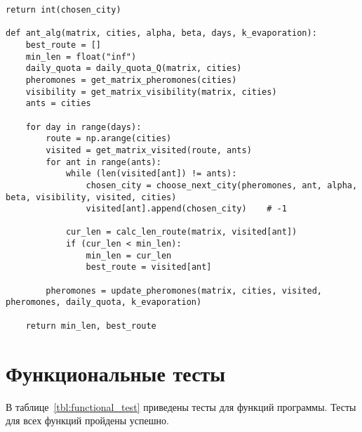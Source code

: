 \begin{center}
\begin{lstlisting}[label=lst:ant,caption=Муравьиный алгоритм]
	return int(chosen_city)

def ant_alg(matrix, cities, alpha, beta, days, k_evaporation):
	best_route = []
	min_len = float("inf")
	daily_quota = daily_quota_Q(matrix, cities)
	pheromones = get_matrix_pheromones(cities)
	visibility = get_matrix_visibility(matrix, cities)
	ants = cities

	for day in range(days):
		route = np.arange(cities)
		visited = get_matrix_visited(route, ants)
		for ant in range(ants):
			while (len(visited[ant]) != ants):
				chosen_city = choose_next_city(pheromones, ant, alpha, beta, visibility, visited, cities)
				visited[ant].append(chosen_city)    # -1

			cur_len = calc_len_route(matrix, visited[ant]) 
			if (cur_len < min_len):
				min_len = cur_len
				best_route = visited[ant]

		pheromones = update_pheromones(matrix, cities, visited, pheromones, daily_quota, k_evaporation)

	return min_len, best_route
\end{lstlisting}
\end{center}


\section{Функциональные тесты}

В таблице~\ref{tbl:functional_test} приведены тесты для функций программы. Тесты для всех функций пройдены успешно.

